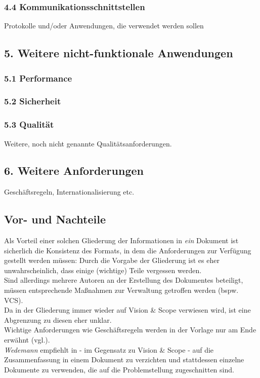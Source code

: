 \subsubsection*{4.4 Kommunikationsschnittstellen}
Protokolle und/oder Anwendungen, die verwendet werden sollen

\subsection*{5. Weitere nicht-funktionale Anwendungen}

\subsubsection*{5.1 Performance}
\subsubsection*{5.2 Sicherheit}
\subsubsection*{5.3 Qualität}
Weitere, noch nicht genannte Qualitätsanforderungen.

\subsection*{6. Weitere Anforderungen}
Geschäftsregeln, Internationalisierung etc.


\subsection{Vor- und Nachteile}
Als Vorteil einer solchen Gliederung der Informationen in \textit{ein} Dokument ist sicherlich die Konsistenz des Formats, in dem die Anforderungen zur Verfügung gestellt werden müssen: Durch die Vorgabe der Gliederung ist es eher unwahrscheinlich, dass einige (wichtige) Teile vergessen werden.\\

\noindent
Sind allerdings mehrere Autoren an der Erstellung des Dokumentes beteiligt, müssen entsprechende Maßnahmen zur Verwaltung getroffen werden (bspw. VCS).\\
Da in der Gliederung immer wieder auf Vision \& Scope verwiesen wird, ist eine Abgrenzung zu diesen eher unklar.\\
Wichtige Anforderungen wie Geschäftsregeln werden in der Vorlage nur am Ende erwähnt (vgl.\cite[79]{Wed09}).\\

\noindent
\textit{Wedemann} empfiehlt in \cite[80]{Wed09} - im Gegensatz zu Vision \& Scope - auf die Zusammenfassung in einem Dokument zu verzichten und stattdessen einzelne Dokumente zu verwenden, die auf die Problemstellung zugeschnitten sind.

